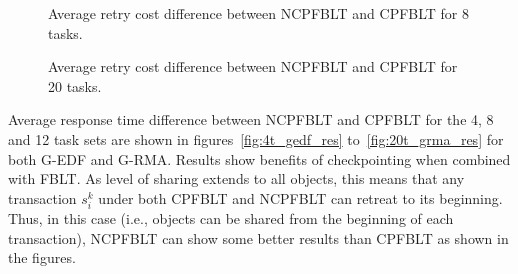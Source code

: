 \documentclass[preprint]{sigplanconf}
\begin{document}
%
%
\begin{figure}
\centering
{}
\caption{Average retry cost difference between NCPFBLT and CPFBLT for 8 tasks.}
\label{fig:8t_rc}
\end{figure}
%
%
\begin{figure}
\centering
{}
\caption{Average retry cost difference between NCPFBLT and CPFBLT for 20 tasks.}
\label{fig:20t_rc}
\end{figure}
%
Average response time difference between NCPFBLT and CPFBLT for the 4, 8 and 12 task sets are shown in figures~\ref{fig:4t_gedf_res} to~\ref{fig:20t_grma_res} for both G-EDF and G-RMA. Results show benefits of checkpointing when combined with FBLT. As level of sharing extends to all objects, this means that any transaction $s_i^k$ under both CPFBLT and NCPFBLT can retreat to its beginning. Thus, in this case (i.e., objects can be shared from the beginning of each transaction), NCPFBLT can show some better results than CPFBLT as shown in the figures.
\end{document}
